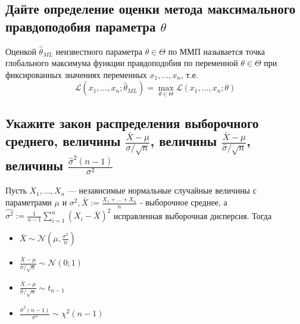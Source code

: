 \documentclass{article}
\begin{document}
\subsection{Дайте определение оценки метода максимального правдоподобия параметра $\theta$}
 Оценкой $\hat{\theta}_{ML}$ неизвестного параметра $\theta \in \Theta$ по ММП называется точка глобального максимума функции правдоподобия по переменной $\theta \in \Theta$ при фиксированных значениях переменных $x_{1}, \ldots, x_{n}$, т.е.
\begin{equation*}
    \mathcal{L}\left(x_{1}, \ldots, x_{n} ; \hat{\theta}_{ML}\right)=\max _{\theta \in \Theta} \mathcal{L}\left(x_{1}, \ldots, x_{n} ; \theta\right)
\end{equation*}

\subsection{Укажите закон распределения выборочного среднего, величины $\frac{\bar{X}-\mu}{\sigma / \sqrt{n}}$, величины $\frac{\bar{X}-\mu}{\hat{\sigma} / \sqrt{n}}$, величины $\frac{\hat{\sigma}^{2}(n-1)}{\sigma^{2}}$}
Пусть $X_{1}, \ldots, X_{n}$ — независимые нормальные случайные величины с параметрами $\mu$ и $\sigma^{2}, \bar{X}:=\frac{X_{1}+\ldots+X_{n}}{n}$ - выборочное среднее, а $\widehat{\sigma^{2}}:=\frac{1}{n-1} \sum_{i=1}^{n}\left(X_{i}-\bar{X}\right)^{2}$ исправленная выборочная дисперсия. Тогда
\begin{itemize}
    \item $\bar{X} \sim \mathcal{N}\left(\mu, \frac{\sigma^2}{n} \right)$
    \item $\frac{\bar{X}-\mu}{\sigma / \sqrt{n}}\sim\mathcal{N}(0;1)$
    \item $\frac{\bar{X}-\mu}{\hat{\sigma} / \sqrt{n}}\sim t_{n-1}$
    \item $\frac{\hat{\sigma}^{2}(n-1)}{\sigma^{2}} \sim \chi^{2}(n-1)$
\end{itemize}
\end{document}
